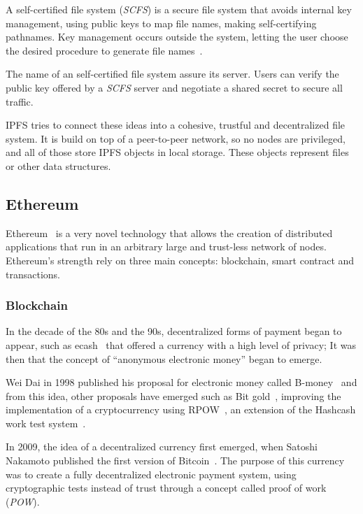A self-certified file system (\emph{SCFS}) is a secure file system that avoids
internal key management, using public keys to map file names, making
self-certifying pathnames. Key management occurs outside the system, letting the
user choose the desired procedure to generate file
names~\cite{mazieres2000self}.

The name of an self-certified file system assure its server. Users can verify
the public key offered by a \emph{SCFS} server and negotiate a shared secret to
secure all traffic.

IPFS tries to connect these ideas into a cohesive, trustful and decentralized
file system. It is build on top of a peer-to-peer network, so no nodes are
privileged, and all of those store IPFS objects in local storage. These objects
represent files or other data structures.


\subsection{Ethereum}
\label{tech:sec:ethereum}

Ethereum~\cite{buterin2014ethereum} is a very novel technology that allows the
creation of distributed applications that run in an arbitrary large and
trust-less network of nodes. Ethereum's strength rely on three main concepts:
blockchain, smart contract and transactions.

\subsubsection*{Blockchain}
\label{tech:sec:ethereum:bc}
In the decade of the 80s and the 90s, decentralized forms of payment began to
appear, such as ecash~\cite{digicash} that offered a currency with a high level
of privacy; It was then that the concept of ``anonymous electronic money'' began
to emerge.

Wei Dai in 1998 published his proposal for electronic money called
B-money~\cite{bmoney} and from this idea, other proposals have emerged such as
Bit gold~\cite{bitgold}, improving the implementation of a cryptocurrency using
RPOW~\cite{finney2005rpow}, an extension of the Hashcash work test
system~\cite{back2002hashcash}.

In 2009, the idea of a decentralized currency first emerged, when Satoshi
Nakamoto published the first version of Bitcoin~\cite{nakamoto2008bitcoin}. The
purpose of this currency was to create a fully decentralized electronic payment
system, using cryptographic tests instead of trust through a concept called
proof of work (\emph{POW}).

